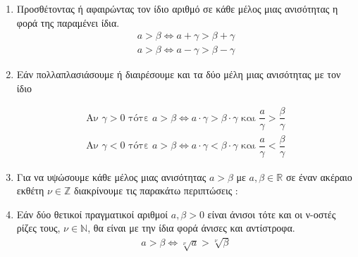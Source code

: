 \thewrhmata
{}\label{th:idan}
\vspace{-5mm}
\begin{enumerate}
\item Προσθέτοντας ή αφαιρώντας τον ίδιο αριθμό σε κάθε μέλος μιας ανισότητας η φορά της παραμένει ίδια.
\begin{gather*}
a>\beta\Leftrightarrow a+\gamma>\beta+\gamma\\
a>\beta\Leftrightarrow a-\gamma>\beta-\gamma
\end{gather*}
\item Εάν πολλαπλασιάσουμε ή διαιρέσουμε και τα δύο μέλη μιας ανισότητας με τον ίδιο
\begin{gather*}
\textrm{Αν }\gamma>0\textrm{ τότε }a>\beta\Leftrightarrow a\cdot\gamma>\beta\cdot\gamma\textrm{ και }\dfrac{a}{\gamma}>\dfrac{\beta}{\gamma}\\
\textrm{Αν }\gamma<0\textrm{ τότε }a>\beta\Leftrightarrow a\cdot\gamma<\beta\cdot\gamma\textrm{ και }\dfrac{a}{\gamma}<\dfrac{\beta}{\gamma}
\end{gather*}
\item Για να υψώσουμε κάθε μέλος μιας ανισότητας $ a>\beta $ με $ a,\beta\in\mathbb{R} $ σε έναν ακέραιο εκθέτη $ \nu\in\mathbb{Z} $ διακρίνουμε τις παρακάτω περιπτώσεις :
\item Εάν δύο θετικοί πραγματικοί αριθμοί $ a,\beta>0 $ είναι άνισοι τότε και οι ν-οστές ρίζες τους, $ \nu\in\mathbb{N} $, θα είναι με την ίδια φορά άνισες και αντίστροφα.
\begin{gather*}
a>\beta\Leftrightarrow\sqrt[\nu]{a}>\!\sqrt[\nu]{\beta}
\end{gather*}
\end{enumerate}
